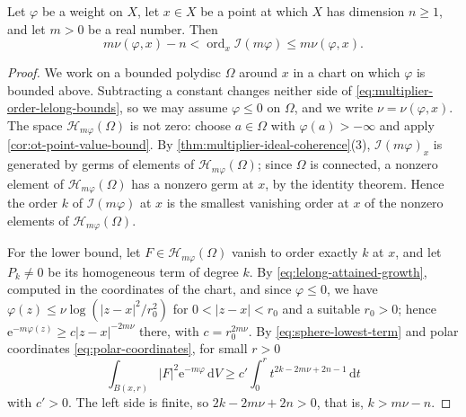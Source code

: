 \begin{lemma}\label{lem:multiplier-order-lelong-bounds}
Let $\varphi$ be a weight on $X$, let $x\in X$ be a point at which $X$ has dimension $n\geq1$, and let $m>0$ be a real number. Then
\begin{equation}\label{eq:multiplier-order-lelong-bounds}
 m\nu(\varphi,x)-n
       <\operatorname{ord}_x\mathcal I(m\varphi)
       \leq m\nu(\varphi,x).
\end{equation}
\end{lemma}
\begin{proof}
We work on a bounded polydisc $\Omega$ around $x$ in a chart on which $\varphi$ is bounded above. Subtracting a constant changes neither side of \eqref{eq:multiplier-order-lelong-bounds}, so we may assume $\varphi\leq0$ on $\Omega$, and we write $\nu=\nu(\varphi,x)$. The space $\mathcal H_{m\varphi}(\Omega)$ is not zero: choose $a\in\Omega$ with $\varphi(a)>-\infty$ and apply \cref{cor:ot-point-value-bound}. By \cref{thm:multiplier-ideal-coherence}(3), $\mathcal I(m\varphi)_x$ is generated by germs of elements of $\mathcal H_{m\varphi}(\Omega)$; since $\Omega$ is connected, a nonzero element of $\mathcal H_{m\varphi}(\Omega)$ has a nonzero germ at $x$, by the identity theorem. Hence the order $k$ of $\mathcal I(m\varphi)$ at $x$ is the smallest vanishing order at $x$ of the nonzero elements of $\mathcal H_{m\varphi}(\Omega)$.

For the lower bound, let $F\in\mathcal H_{m\varphi}(\Omega)$ vanish to order exactly $k$ at $x$, and let $P_k\neq0$ be its homogeneous term of degree $k$. By \eqref{eq:lelong-attained-growth}, computed in the coordinates of the chart, and since $\varphi\leq0$, we have $\varphi(z)\leq\nu\log(|z-x|^2/r_0^2)$ for $0<|z-x|<r_0$ and a suitable $r_0>0$; hence $\mathrm e^{-m\varphi(z)}\geq c|z-x|^{-2m\nu}$ there, with $c=r_0^{2m\nu}$. By \eqref{eq:sphere-lowest-term} and polar coordinates \eqref{eq:polar-coordinates}, for small $r>0$
\[
 \int_{B(x,r)}|F|^2\mathrm e^{-m\varphi}\,\mathrm dV
 \geq c'\int_0^rt^{2k-2m\nu+2n-1}\,\mathrm dt
\]
with $c'>0$. The left side is finite, so $2k-2m\nu+2n>0$, that is, $k>m\nu-n$.


\end{proof}
